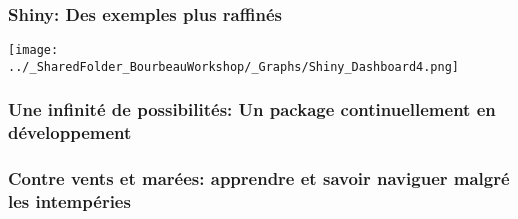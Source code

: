 \documentclass{beamer}
\begin{document}
    

    \begin{frame}
    
      \frametitle{Shiny: Des exemples plus raffinés} \vspace{1cm}
      
        \begin{center}
      	  \texttt{[image: ../\_SharedFolder\_BourbeauWorkshop/\_Graphs/Shiny\_Dashboard4.png]}
        \end{center} 
      
          
    \end{frame}  
    


    \begin{frame}
    
        \frametitle{Une infinité de possibilités: Un package continuellement en développement} \vspace{1cm}
    
    \end{frame}
    


    \begin{frame}
    
        \frametitle{Contre vents et marées: apprendre \R et savoir naviguer malgré les intempéries} \vspace{1cm}
    
    \end{frame}
    
\end{document}
